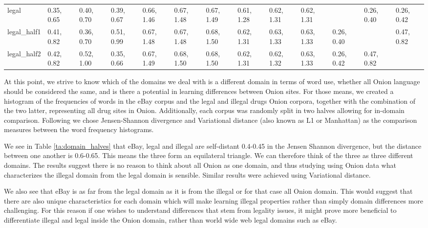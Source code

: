 \documentclass[11pt,a4paper,table]{article}
\begin{document}
\begin{table*}[]
{\begin{tabular}{@{}lllllllllllll@{}}
            legal            & 0.35, 0.65 & 0.40, 0.70       & 0.39, 0.67       & 0.66, 1.46 & 0.67, 1.48  & 0.67, 1.49  & 0.61, 1.28 & 0.62, 1.31     & 0.62, 1.31     &            & 0.26, 0.40   & 0.26, 0.42   \\
            legal\_half1     & 0.41, 0.82 & 0.36, 0.70       & 0.51, 0.99       & 0.67, 1.48 & 0.67, 1.48  & 0.68, 1.50  & 0.62, 1.31 & 0.63, 1.33     & 0.63, 1.33     & 0.26, 0.40 &              & 0.47, 0.82   \\
            legal\_half2     & 0.42, 0.82 & 0.52, 1.00       & 0.35, 0.66       & 0.67, 1.49 & 0.68, 1.50  & 0.68, 1.50  & 0.62, 1.31 & 0.62, 1.32     & 0.63, 1.33     & 0.26, 0.42 & 0.47, 0.82   &             
        \end{tabular}%
    }
    \caption{Jensen-Shannon divergence and Variational distance between word distribution in all Onion drug sites, legal and illegal Onion drug sites, and eBay sites.
    Each domain was also split in half for within-domain comparison. \label{ta:domain_halves}}
    
\end{table*}
At this point, we strive to know which of the domains we deal with is a different domain in terms of word use, whether all Onion language should be considered the same, and is there a potential in learning differences between Onion sites. For those means, we created a histogram of the frequencies of words in the eBay corpus and the legal and illegal drugs Onion corpora, together with the combination of the two latter, representing all drug sites in Onion. Additionally, each corpus was randomly split in two halves allowing for in-domain comparison. Following \citet{Plank2011EffectiveMO} we chose Jensen-Shannon divergence and Variational distance (also known as L1 or Manhattan) as the comparison measures between the word frequency histograms.

We see in Table \ref{ta:domain_halves} that eBay, legal and illegal are self-distant 0.4-0.45 in the Jensen Shannon divergence, but the distance between one another is 0.6-0.65. This means the three form an equilateral triangle. We can therefore think of the three as three different domains. The results suggest there is no reason to think about all Onion as one domain, and thus studying using Onion data what characterizes the illegal domain from the legal domain is sensible. Similar results were achieved using Variational distance.

We also see that eBay is as far from the legal domain as it is from the illegal or for that case all Onion domain. This would suggest that there are also unique characteristics for each domain which will make learning illegal properties rather than simply domain differences more challenging. For this reason if one wishes to understand differences that stem from legality issues, it might prove more beneficial to differentiate illegal and legal inside the Onion domain, rather than world wide web legal domains such as eBay.
\end{document}
